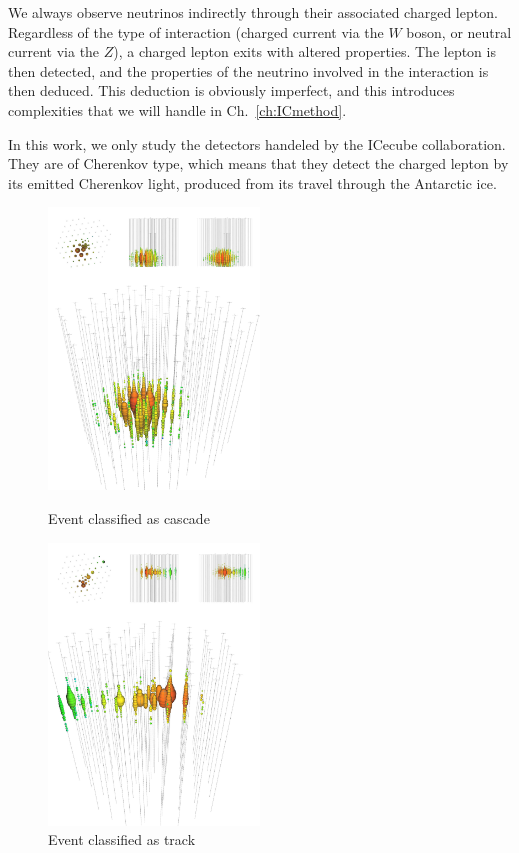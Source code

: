 \documentclass[draft=True]{thesis}
\begin{document}
We always observe neutrinos indirectly through their associated charged lepton. Regardless of the type of interaction (charged current via the $W$ boson, or neutral current
via the $Z$), a charged lepton exits with altered properties. The lepton is then detected, and the properties of the neutrino involved in the 
interaction is then deduced. This deduction is obviously imperfect, and this introduces complexities that we will handle in Ch.~\ref{ch:ICmethod}. 

In this work, we only study the detectors handeled by the ICecube collaboration. They are of Cherenkov type, which means that they detect 
the charged lepton by its emitted Cherenkov light, produced from its travel through the Antarctic ice. 
\begin{figure}\label{fig:events}
    \includegraphics[width=0.5\textwidth]{figures/cascade_event.pdf}\caption{Event classified as cascade}
    \includegraphics[width=0.5\textwidth]{figures/track_event.pdf}\caption{Event classified as track}
\end{figure}
\end{document}
